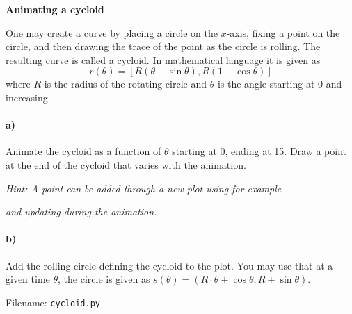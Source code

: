 \begin{Problem}{\textbf{Animating a cycloid}}

\noindent One may create a curve by placing a circle on the $x$-axis, fixing a point on the circle,
and then drawing the trace of the point as the circle is rolling. The resulting
curve is called a cycloid. In mathematical language it is given as
\begin{equation*}
    r(\theta) =[R(\theta-\sin\theta), R(1-\cos \theta)]
\end{equation*}
where $R$ is the radius of the rotating circle and $\theta$ is the angle starting
at 0 and increasing.

\paragraph{a)}
Animate the cycloid as a function of $\theta$ starting at 0, ending at 15. Draw
a point at the end of the cycloid that varies with the animation.

\emph{Hint: A point can be added through a new plot using for example}
\newline
{}

\emph{and updating during the animation.}

\paragraph{b)}
Add the rolling circle defining the cycloid to the plot. You may use that at a given
time $\theta$, the circle is given as $s(\theta)=(R\cdot\theta + \cos\theta, R + \sin\theta)$.

Filename: \texttt{cycloid.py}
\end{Problem}

